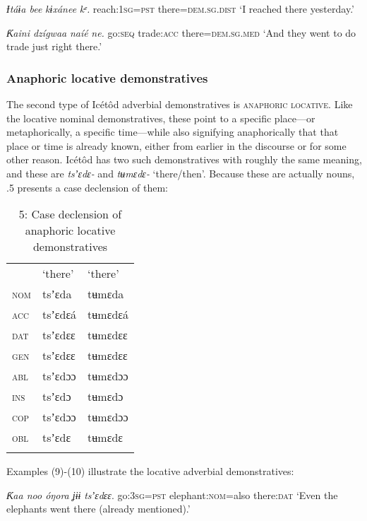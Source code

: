 \textit{Ɨ}\textit{táɨa bee}     \textit{kɨxánee}\textit{ kᵉ.}
reach:\textsc{1sg}=\textsc{pst}   there=\textsc{dem.sg.dist}
‘I reached there yesterday.’




\textit{Ƙ}\textit{aini   dzígwaa}   \textit{naíé}\textit{ ne.}
go:\textsc{seq}   trade:\textsc{acc}   there=\textsc{dem.sg.med}
‘And they went to do trade just right there.’




\subsubsection{Anaphoric locative demonstratives}

The second type of Icétôd adverbial demonstratives is \textsc{anaphoric} \textsc{locative}. Like the locative nominal demonstratives, these point to a specific place—or metaphorically, a specific time—while also signifying anaphorically that that place or time is already known, either from earlier in the discourse or for some other reason. Icétôd has two such demonstratives with roughly the same meaning, and these are \textit{tsʼɛdɛ-} and \textit{tʉmɛdɛ-} ‘there/then’. Because these are actually nouns, .5 presents a case declension of them:


\begin{table}
\caption{5: Case declension of anaphoric locative demonstratives}
\label{tab:6}


\begin{tabularx}{\textwidth}{XXX} & ‘there’ & ‘there’\\
\lsptoprule
\textsc{nom} & tsʼɛda & tʉmɛda\\
\textsc{acc} & tsʼɛdɛá & tʉmɛdɛá\\
\textsc{dat} & tsʼɛdɛɛ & tʉmɛdɛɛ\\
\textsc{gen} & tsʼɛdɛɛ & tʉmɛdɛɛ\\
\textsc{abl} & tsʼɛdɔɔ & tʉmɛdɔɔ\\
\textsc{ins} & tsʼɛdɔ & tʉmɛdɔ\\
\textsc{cop} & tsʼɛdɔɔ & tʉmɛdɔɔ\\
\textsc{obl} & tsʼɛdɛ & tʉmɛdɛ\\
\lspbottomrule
\end{tabularx}
\end{table}
Examples (9)-(10) illustrate the locative adverbial demonstratives:




\textit{Ƙ}\textit{aa noo   óŋora ʝɨɨ}     \textit{tsʼɛdɛɛ}.
go:\textsc{3sg=pst}   elephant:\textsc{nom}=also   there:\textsc{dat}
‘Even the elephants went there (already mentioned).’





